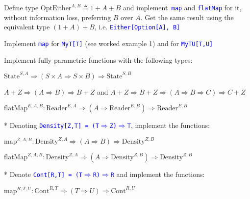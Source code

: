 Define type {\footnotesize{}$\text{OptEither}^{A,B}\triangleq1+A+B$
}and implement\texttt{\textcolor{blue}{\footnotesize{} map}} and \texttt{\textcolor{blue}{\footnotesize{}flatMap}}
for it, without information loss, preferring $B$ over $A$. Get the
same result using the equivalent type {\footnotesize{}$(1+A)+B$},
i.e. \texttt{\textcolor{blue}{\footnotesize{}Either{[}Option{[}A{]},
B{]}}}{\footnotesize\par}

Implement \texttt{\textcolor{blue}{\footnotesize{}map}} for \texttt{\textcolor{blue}{\footnotesize{}MyT{[}T{]}}}
(see worked example 1) and for \texttt{\textcolor{blue}{\footnotesize{}MyTU{[}T,U{]}}}{\footnotesize\par}

Implement fully parametric functions with the following types:

{\footnotesize{}$\text{State}^{S,A}\Rightarrow\left(S\times A\Rightarrow S\times B\right)\Rightarrow\text{State}^{S,B}$}{\footnotesize\par}

{\footnotesize{}$A+Z\Rightarrow(A\Rightarrow B)\Rightarrow B+Z$ and
$A+Z\Rightarrow B+Z\Rightarrow(A\Rightarrow B\Rightarrow C)\Rightarrow C+Z$}{\footnotesize\par}

{\footnotesize{}$\text{flatMap}^{E,A,B}:\text{Reader}^{E,A}\Rightarrow(A\Rightarrow\text{Reader}^{E,B})\Rightarrow\text{Reader}^{E,B}$}{\footnotesize\par}

{*} Denoting \texttt{\textcolor{blue}{\footnotesize{}Density{[}Z,T{]}
= (T$\Rightarrow$Z)$\Rightarrow$T}}, implement the functions:

{\footnotesize{}$\text{map}^{Z,A,B}:\text{Density}^{Z,A}\Rightarrow\left(A\Rightarrow B\right)\Rightarrow\text{Density}^{Z,B}$}{\footnotesize\par}

{\footnotesize{}$\text{flatMap}^{Z,A,B}:\text{Density}^{Z,A}\Rightarrow(A\Rightarrow\text{Density}^{Z,B})\Rightarrow\text{Density}^{Z,B}$}{\footnotesize\par}

{*} Denote \texttt{\textcolor{blue}{\footnotesize{}Cont{[}R,T{]} =
(T$\Rightarrow$R)$\Rightarrow$R}} and implement the functions:

{\footnotesize{}$\text{map}^{R,T,U}:\text{Cont}^{R,T}\Rightarrow(T\Rightarrow U)\Rightarrow\text{Cont}^{R,U}$}{\footnotesize\par}

